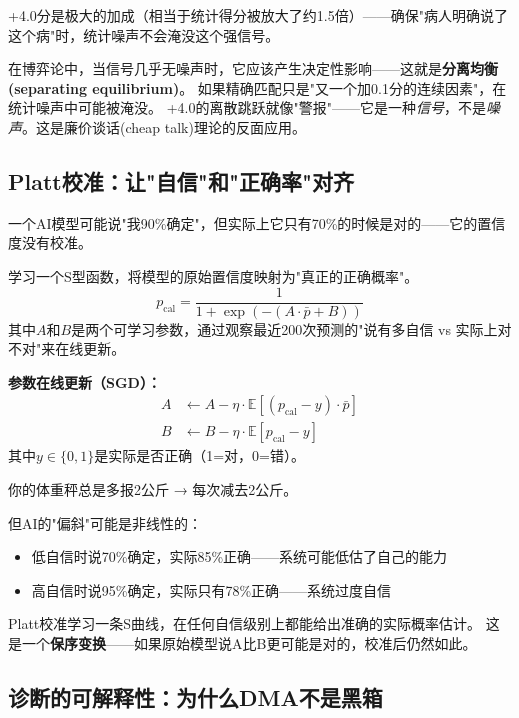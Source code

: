 \documentclass[11pt,a4paper]{ctexart}
\begin{document}
+4.0分是极大的加成（相当于统计得分被放大了约1.5倍）——确保"病人明确说了这个病"时，统计噪声不会淹没这个强信号。

\begin{deepbox}
在博弈论中，当信号几乎无噪声时，它应该产生决定性影响——这就是\textbf{分离均衡 (separating equilibrium)}。
如果精确匹配只是"又一个加0.1分的连续因素"，在统计噪声中可能被淹没。
+4.0的离散跳跃就像"警报"——它是一种\emph{信号}，不是\emph{噪声}。这是廉价谈话(cheap talk)理论的反面应用。
\end{deepbox}

\subsection{Platt校准：让"自信"和"正确率"对齐}

一个AI模型可能说"我90\%确定"，但实际上它只有70\%的时候是对的——它的置信度没有校准。

\begin{defbox}
学习一个S型函数，将模型的原始置信度映射为"真正的正确概率"。
$$p_{\text{cal}} = \frac{1}{1 + \exp(-(A \cdot \bar{p} + B))}$$
其中$A$和$B$是两个可学习参数，通过观察最近200次预测的"说有多自信 vs 实际上对不对"来在线更新。
\end{defbox}

\textbf{参数在线更新（SGD）：}
\begin{align*}
A &\leftarrow A - \eta \cdot \mathbb{E}[(p_{\text{cal}} - y) \cdot \bar{p}] \\
B &\leftarrow B - \eta \cdot \mathbb{E}[p_{\text{cal}} - y]
\end{align*}
其中$y \in \{0, 1\}$是实际是否正确（1=对，0=错）。

\begin{exambox}
你的体重秤总是多报2公斤 → 每次减去2公斤。

但AI的"偏斜"可能是非线性的：
\begin{itemize}[nosep]
\item 低自信时说70\%确定，实际85\%正确——系统可能低估了自己的能力
\item 高自信时说95\%确定，实际只有78\%正确——系统过度自信
\end{itemize}
Platt校准学习一条S曲线，在任何自信级别上都能给出准确的实际概率估计。
这是一个\textbf{保序变换}——如果原始模型说A比B更可能是对的，校准后仍然如此。
\end{exambox}


\subsection{诊断的可解释性：为什么DMA不是黑箱}
\end{document}
